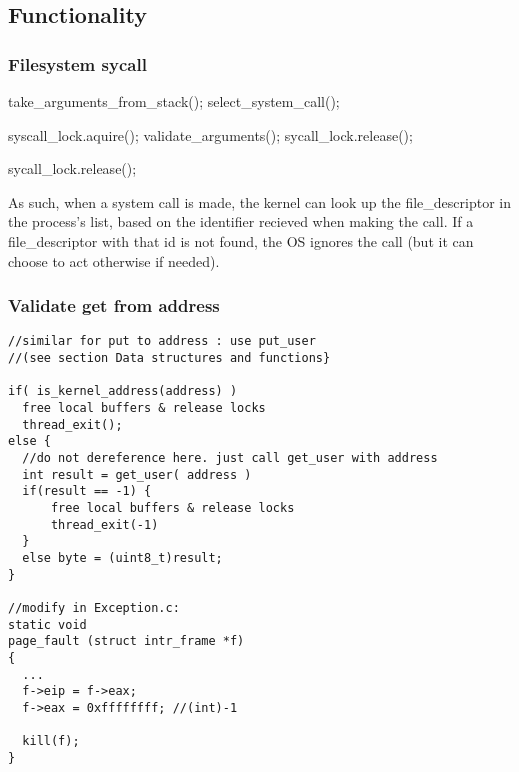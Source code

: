     \subsection{Functionality}

    \subsubsection{Filesystem sycall}
    \vspace{-3em} %
      \begin{program}

	take\_arguments\_from\_stack();
	select\_system\_call();
	
	syscall\_lock.aquire();
	validate\_arguments();
	\IF {}
	  \THEN sycall\_lock.release();
	\FI
	

	\IF {}
	  \THEN sycall\_lock.release();
	\FI


      \end{program}

    As such, when a system call is made, the kernel can look up the file\_descriptor in the process's list, based on the identifier recieved when making the call. If a file\_descriptor with that id is not found, the OS ignores the call (but it can choose to act otherwise if needed).

    \subsubsection{Validate get from address}
    \vspace{-1em} %
      \begin{lstlisting}
//similar for put to address : use put_user
//(see section Data structures and functions}

if( is_kernel_address(address) )
  free local buffers & release locks
  thread_exit(); 
else {
  //do not dereference here. just call get_user with address
  int result = get_user( address ) 
  if(result == -1) {
      free local buffers & release locks
      thread_exit(-1)
  }	
  else byte = (uint8_t)result;
}

//modify in Exception.c:
static void
page_fault (struct intr_frame *f)
{
  ...
  f->eip = f->eax;
  f->eax = 0xffffffff; //(int)-1
  
  kill(f);
}
      \end{lstlisting}


